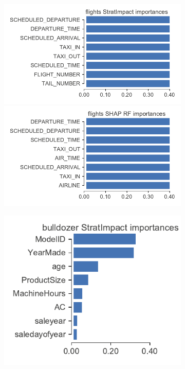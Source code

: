 \documentclass[11pt]{article}
\begin{document}
{\begin{figure}
\begin{subfigure}{1\textwidth}
\includegraphics[scale=0.5]{images/flights-features.pdf}
\includegraphics[scale=0.5]{images/flights-features-shap-rf.pdf}
\vspace{-2mm}\vspace{3mm}
\end{subfigure}
\hfill
\begin{subfigure}{1\textwidth}
    \centering
\includegraphics[scale=0.5]{images/bulldozer-features.pdf}

\end{subfigure}
\end{figure}}
\end{document}
